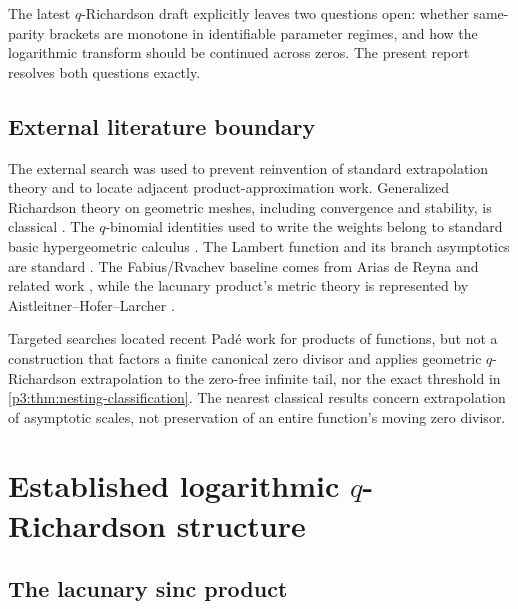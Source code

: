 \documentclass[11pt]{article}
\numberwithin{equation}{section}
\theoremstyle{definition}
\theoremstyle{remark}
\begin{document}
\begin{resultbox}
The latest $q$-Richardson draft explicitly leaves two questions open: whether same-parity
brackets are monotone in identifiable parameter regimes, and how the logarithmic transform
should be continued across zeros.  The present report resolves both questions exactly.
\end{resultbox}

\subsection{External literature boundary}\label{p3:sec:literature}

The external search was used to prevent reinvention of standard extrapolation theory and to
locate adjacent product-approximation work.  Generalized Richardson theory on geometric
meshes, including convergence and stability, is classical \cite{p3:sidi1996,p3:sidi-siam}.  The
$q$-binomial identities used to write the weights belong to standard basic hypergeometric
calculus \cite{p3:gasper-rahman}.  The Lambert function and its branch asymptotics are standard
\cite{p3:corless}.  The Fabius/Rvachev baseline comes from Arias de Reyna and related work
\cite{p3:arias-function,p3:arias-arithmetic,p3:haugland}, while the lacunary product's metric theory
is represented by Aistleitner--Hofer--Larcher \cite{p3:ahl2017}.

Targeted searches located recent Pad\'e work for products of functions, but not a construction
that factors a finite canonical zero divisor and applies geometric $q$-Richardson
extrapolation to the zero-free infinite tail, nor the exact threshold in
\cref{p3:thm:nesting-classification}.  The nearest classical results concern extrapolation of
asymptotic scales, not preservation of an entire function's moving zero divisor.

\section{Established logarithmic \texorpdfstring{$q$}{q}-Richardson structure}\label{p3:sec:baseline}

\subsection{The lacunary sinc product}
\end{document}
